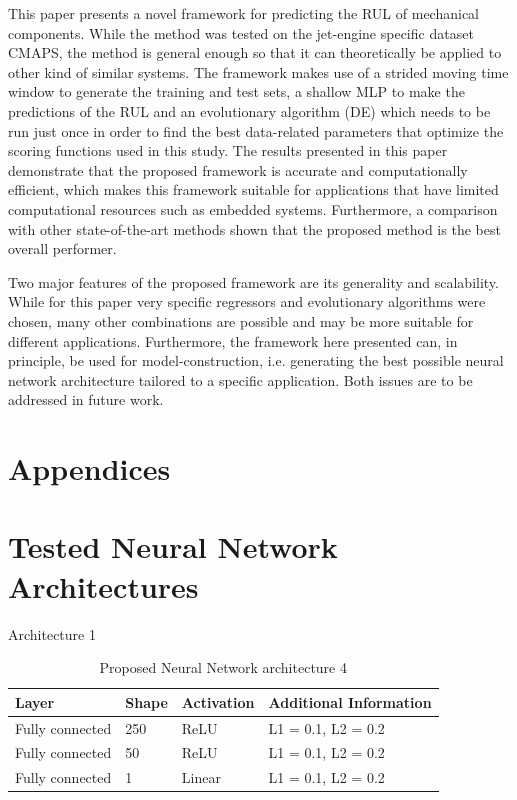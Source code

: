 \documentclass{article}
\begin{document}
This paper presents a novel framework for predicting the RUL of mechanical components. While the method was tested on the jet-engine specific dataset CMAPS, the method is general enough so that it can theoretically be applied to other kind of similar systems. The framework makes use of a strided moving time window to generate the training and test sets, a shallow MLP to make the predictions of the RUL and an evolutionary algorithm (DE) which needs to be run just once in order to find the best data-related parameters that optimize the scoring functions used in this study.  The results presented in this paper demonstrate that the proposed framework is accurate and computationally efficient, which makes this framework suitable for applications that have limited computational resources such as embedded systems. Furthermore, a comparison with other state-of-the-art methods shown that the proposed method is the best overall performer. 

Two major features of the proposed framework are its generality and scalability. While for this paper very specific regressors and evolutionary algorithms were chosen, many other combinations are possible and may be more suitable for different applications. Furthermore, the framework here presented can, in principle, be used for model-construction, i.e. generating the best possible neural network architecture tailored to a specific application. Both issues are to be addressed in future work.


\pagebreak
\appendix
{}
\section*{Appendices}

\section{Tested Neural Network Architectures}
\label{sec:appendices}

Architecture 1

\begin{table}[!htb]
\centering
\begin{tabular}{l l l l}
	\hline
	Layer & Shape & Activation & Additional Information\\
  	\hline
  	Fully connected & 250 & ReLU & L1 = 0.1, L2 = 0.2\\
  	Fully connected & 50 & ReLU & L1 = 0.1, L2 = 0.2\\
  	Fully connected & 1 & Linear & L1 = 0.1, L2 = 0.2\\
  	\hline
\end{tabular}
\caption{Proposed Neural Network architecture 4}
\label{table:proposed_nn_4}
\end{table}
\end{document}
